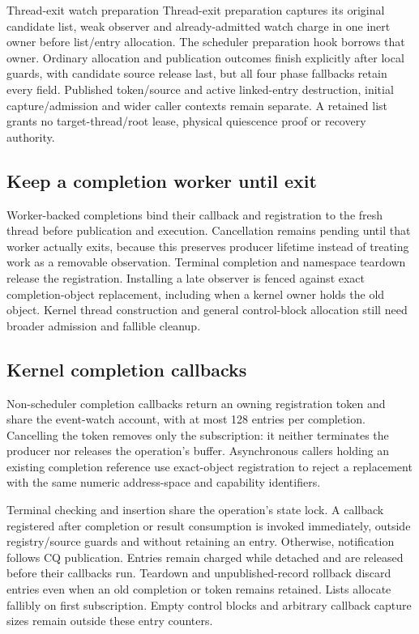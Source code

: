 \begin{implementationdetail}{Thread-exit watch preparation}
Thread-exit preparation captures its original candidate list, weak observer and
already-admitted watch charge in one inert owner before list/entry allocation.
The scheduler preparation hook borrows that owner. Ordinary allocation and
publication outcomes finish explicitly after local guards, with candidate source
release last, but all four phase fallbacks retain every field. Published token/source
and active linked-entry destruction, initial capture/admission and wider
caller contexts remain separate. A retained list grants no target-thread/root
lease, physical quiescence proof or recovery authority.
\end{implementationdetail}

\subsection{Keep a completion worker until exit}

Worker-backed completions bind their callback and registration to the fresh
thread before publication and execution. Cancellation remains pending until
that worker actually exits, because this preserves producer lifetime instead of treating
work as a removable observation. Terminal completion and namespace teardown
release the registration. Installing a late observer is fenced against exact
completion-object replacement, including when a kernel owner holds the old
object. Kernel thread construction and general control-block allocation still
need broader admission and fallible cleanup.

\subsection{Kernel completion callbacks}

Non-scheduler completion callbacks return an owning registration token and share
the event-watch account, with at most 128 entries per completion. Cancelling the
token removes only the subscription: it neither terminates the producer nor
releases the operation's buffer. Asynchronous callers holding an existing
completion reference use exact-object registration to reject a replacement with
the same numeric address-space and capability identifiers.

Terminal checking and insertion share the operation's state lock. A callback
registered after completion or result consumption is invoked immediately,
outside registry/source guards and without retaining an entry. Otherwise,
notification follows CQ publication. Entries remain charged while detached and
are released before their callbacks run. Teardown and unpublished-record rollback
discard entries even when an old completion or token remains retained.
Lists allocate fallibly on first subscription. Empty control blocks and arbitrary
callback capture sizes remain outside these entry counters.

